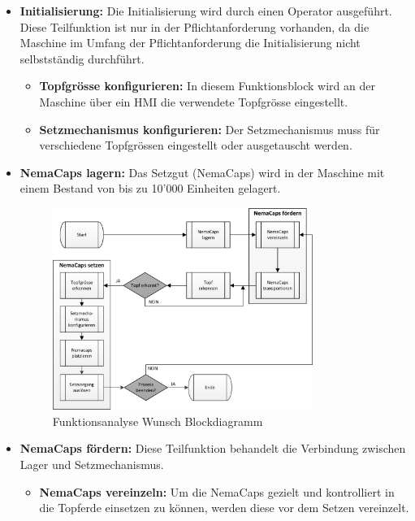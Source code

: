 \begin{itemize}
	\item \textbf{Initialisierung:} Die Initialisierung wird durch einen Operator ausgeführt. Diese Teilfunktion ist nur in der Pflichtanforderung vorhanden, da die Maschine im Umfang der Pflichtanforderung die Initialisierung nicht selbstständig durchführt.
	
	\begin{itemize}
		\item \textbf{Topfgrösse konfigurieren:} In diesem Funktionsblock wird an der Maschine über ein HMI die verwendete Topfgrösse eingestellt.

		\item \textbf{Setzmechanismus konfigurieren:} Der Setzmechanismus muss für verschiedene Topfgrössen eingestellt oder ausgetauscht werden.
	\end{itemize}
	
	\item \textbf{NemaCaps lagern:} Das Setzgut (NemaCaps) wird in der Maschine mit einem Bestand von bis zu 10'000 Einheiten gelagert.
	
	\begin{figure}[H]
		\includegraphics[width=0.8\textwidth]{Illustrationen/4-Entwurf/Funktionsanalyse_Wunsch.png}
		\caption{Funktionsanalyse Wunsch Blockdiagramm}
		\label{fig:FunktWunsch}
	\end{figure}
	
	\item \textbf{NemaCaps fördern:} Diese Teilfunktion behandelt die Verbindung zwischen Lager und Setzmechanismus.
	
	\begin{itemize}
		\item \textbf{NemaCaps vereinzeln:} Um die NemaCaps gezielt und kontrolliert in die Topferde einsetzen zu können, werden diese vor dem Setzen vereinzelt.
		

\end{itemize}
\end{itemize}

